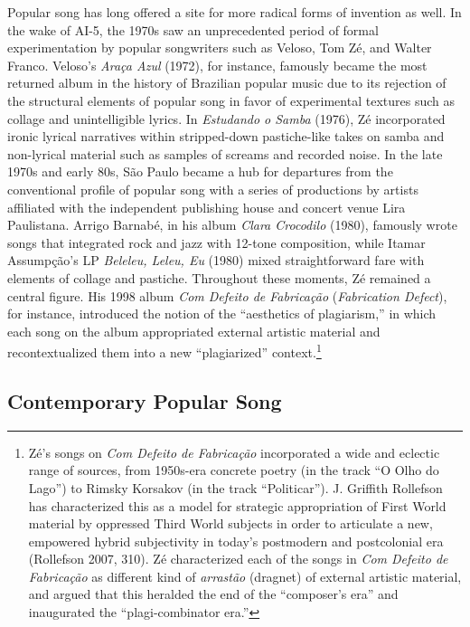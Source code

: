 \documentclass[twoside]{article}
\begin{document}
Popular song has long offered a site for more radical forms of invention
as well. In the wake of AI-5, the 1970s saw an unprecedented period of
formal experimentation by popular songwriters such as Veloso, Tom Zé,
and Walter Franco. Veloso's \emph{Araça Azul} (1972), for instance,
famously became the most returned album in the history of Brazilian
popular music due to its rejection of the structural elements of popular
song in favor of experimental textures such as collage and
unintelligible lyrics. In \emph{Estudando o Samba} (1976), Zé
incorporated ironic lyrical narratives within stripped-down
pastiche-like takes on samba and non-lyrical material such as samples of
screams and recorded noise. In the late 1970s and early 80s, São Paulo
became a hub for departures from the conventional profile of popular
song with a series of productions by artists affiliated with the
independent publishing house and concert venue Lira Paulistana. Arrigo
Barnabé, in his album \emph{Clara Crocodilo} (1980), famously wrote
songs that integrated rock and jazz with 12-tone composition, while
Itamar Assumpção's LP \emph{Beleleu, Leleu, Eu} (1980) mixed
straightforward fare with elements of collage and pastiche. Throughout
these moments, Zé remained a central figure. His 1998 album \emph{Com
Defeito de Fabricação} (\emph{Fabrication Defect}), for instance,
introduced the notion of the ``aesthetics of plagiarism,'' in which each
song on the album appropriated external artistic material and
recontextualized them into a new ``plagiarized'' context.\footnote{Zé's
  songs on \emph{Com Defeito de Fabricação} incorporated a wide and
  eclectic range of sources, from 1950s-era concrete poetry (in the
  track ``O Olho do Lago'') to Rimsky Korsakov (in the track
  ``Politicar''). J. Griffith Rollefson has characterized this as a
  model for strategic appropriation of First World material by oppressed
  Third World subjects in order to articulate a new, empowered hybrid
  subjectivity in today's postmodern and postcolonial era (Rollefson
  2007, 310). Zé characterized each of the songs in \emph{Com Defeito de
  Fabricação} as different kind of \emph{arrastão} (dragnet) of external
  artistic material, and argued that this heralded the end of the
  ``composer's era'' and inaugurated the ``plagi-combinator era.''}

\hypertarget{contemporary-popular-song}{%
\subsection*{Contemporary Popular Song}\label{contemporary-popular-song}}
\end{document}
